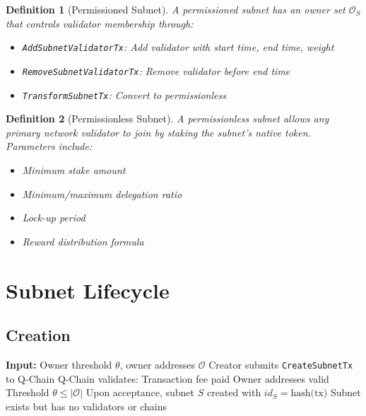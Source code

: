 \documentclass[11pt,a4paper]{article}
\newtheorem{definition}{Definition}
\begin{document}
\begin{definition}[Permissioned Subnet]
A permissioned subnet has an owner set $\mathcal{O}_S$ that controls validator membership through:
\begin{itemize}
    \item \texttt{AddSubnetValidatorTx}: Add validator with start time, end time, weight
    \item \texttt{RemoveSubnetValidatorTx}: Remove validator before end time
    \item \texttt{TransformSubnetTx}: Convert to permissionless
\end{itemize}
\end{definition}

\begin{definition}[Permissionless Subnet]
A permissionless subnet allows any primary network validator to join by staking the subnet's native token. Parameters include:
\begin{itemize}
    \item Minimum stake amount
    \item Minimum/maximum delegation ratio
    \item Lock-up period
    \item Reward distribution formula
\end{itemize}
\end{definition}

\section{Subnet Lifecycle}

\subsection{Creation}

\begin{algorithm}
\caption{Subnet Creation}
\begin{algorithmic}[1]
\STATE \textbf{Input:} Owner threshold $\theta$, owner addresses $\mathcal{O}$
\STATE Creator submits \texttt{CreateSubnetTx} to Q-Chain
\STATE Q-Chain validates:
    \STATE \quad Transaction fee paid
    \STATE \quad Owner addresses valid
    \STATE \quad Threshold $\theta \leq |\mathcal{O}|$
\STATE Upon acceptance, subnet $S$ created with $id_S = \text{hash(tx)}$
\STATE Subnet exists but has no validators or chains
\end{algorithmic}
\end{algorithm}
\end{document}
